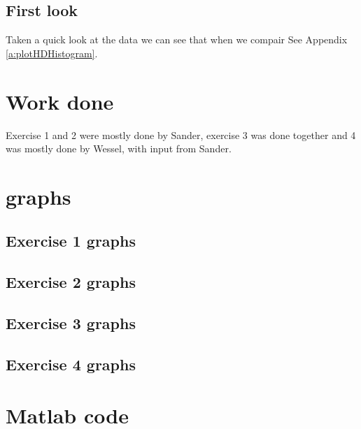 \documentclass[10pt,a4paper]{article}
\begin{document}
\subsection{First look}
Taken a quick look at the data we can see that when we compair 
See Appendix \ref{a:plotHDHistogram}.
\subsection{}

\section{Work done}
Exercise 1 and 2 were mostly done by Sander, exercise 3 was done together and 4 was mostly done by Wessel, with input from Sander.

\appendix
\section{graphs}
\subsection{Exercise 1 graphs}

\subsection{Exercise 2 graphs}

\subsection{Exercise 3 graphs}

\subsection{Exercise 4 graphs}

\section{Matlab code}
\end{document}
